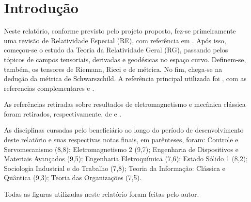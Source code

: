 \chapter*{Introdução}
Neste relatório, conforme previsto pelo projeto proposto, fez-se primeiramente uma revisão de Relatividade Especial (RE), com referência em \cite{dray2012geometry}. Após isso, começou-se o estudo da Teoria da Relatividade Geral (RG), passando pelos tópicos de campos tensoriais, derivadas e geodésicas no espaço curvo. Definem-se, também, os tensores de Riemann, Ricci e de métrica. No fim, chega-se na dedução da métrica de Schwarszchild. A referência principal utilizada foi \cite{foster2010short}, com as referencias complementares \cite{hartle2003gravity} e \cite{schutz2009first}. 

As referências retiradas sobre resultados de eletromagnetismo e mecânica clássica foram retirados, respectivamente, de \cite{griffiths2005introduction} e \cite{nussenzveig2013curso}. %

As disciplinas cursadas pelo beneficiário ao longo do período de desenvolvimento deste relatório e suas respectivas notas finais, em parênteses, foram: Controle e Servomecanismo (8,8); Eletromagnetismo 2 (9,7); Engenharia de Dispositivos e Materiais Avançados (9,5); Engenharia Eletroquímica (7,6); Estado Sólido 1 (8,2); Sociologia Industrial e do Trabalho (7,8); Teoria da Informação: Clássica e Quântica (9,3); Teoria das Organizações (7,5).

Todas as figuras utilizadas neste relatório foram feitas pelo autor.